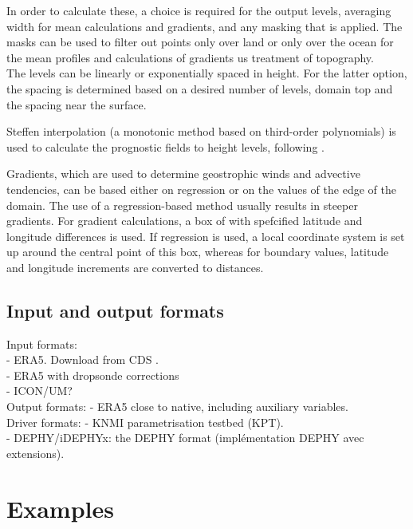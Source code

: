 \documentclass[a4paper,11pt]{article}
\begin{document}
In order to calculate these, a choice is required for the output
levels, averaging width for mean calculations and gradients, and any
masking that is applied. The masks can be used to filter out points
only over land or only over the ocean for the mean profiles
and calculations of gradients us treatment of topography. \\

The levels can be linearly or exponentially spaced in height. For the
latter option, the spacing is determined based on a desired number of
levels, domain top and the spacing near the surface.

Steffen interpolation (a monotonic method based on third-order
polynomials) is used to calculate the prognostic fields to height
levels, following \cite{yamaguchi2012}.

Gradients, which are used to determine geostrophic winds and advective
tendencies, can be based either on regression or on the values of the
edge of the domain. The use of a regression-based method usually
results in steeper gradients. For gradient calculations, a box of with
spefcified latitude and longitude differences is used. If regression is used,
a local coordinate system is set up around the central point of this box,
whereas for boundary values, latitude and longitude increments are
converted to distances.

\subsection{Input and output formats}

Input formats: \\
- ERA5. Download from CDS . \\
- ERA5 with dropsonde corrections \citep{bony2019} \\
- ICON/UM? \\

Output formats:
- ERA5 close to native, including auxiliary variables. \\

Driver formats:
- KNMI parametrisation testbed (KPT). \\
- DEPHY/iDEPHYx: the DEPHY format (impl\'ementation DEPHY avec extensions). \\

\section{Examples}\label{sec:examples}
\end{document}
